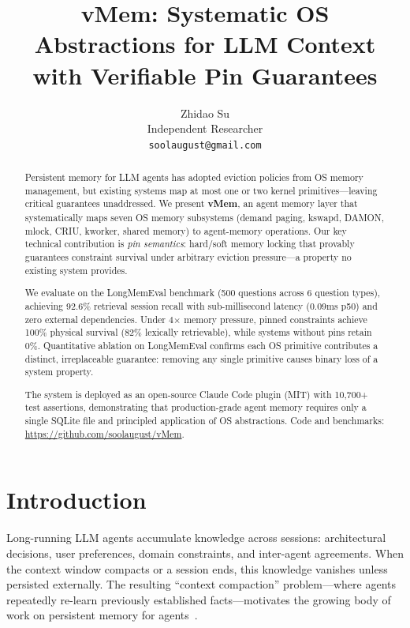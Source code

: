 \documentclass[10pt,twocolumn]{article}
\title{\textbf{vMem: Systematic OS Abstractions for LLM Context\\with Verifiable Pin Guarantees}}
\author{
  Zhidao Su \\
  Independent Researcher \\
  \texttt{soolaugust@gmail.com}
}
\date{}
\begin{document}
\maketitle

\begin{abstract}
Persistent memory for LLM agents has adopted eviction policies from OS memory management, but existing systems map at most one or two kernel primitives---leaving critical guarantees unaddressed. We present \textbf{vMem}, an agent memory layer that systematically maps seven OS memory subsystems (demand paging, kswapd, DAMON, mlock, CRIU, kworker, shared memory) to agent-memory operations. Our key technical contribution is \emph{pin semantics}: hard/soft memory locking that provably guarantees constraint survival under arbitrary eviction pressure---a property no existing system provides.

We evaluate on the LongMemEval benchmark (500 questions across 6 question types), achieving 92.6\% retrieval session recall with sub-millisecond latency (0.09ms p50) and zero external dependencies. Under 4$\times$ memory pressure, pinned constraints achieve 100\% physical survival (82\% lexically retrievable), while systems without pins retain 0\%. Quantitative ablation on LongMemEval confirms each OS primitive contributes a distinct, irreplaceable guarantee: removing any single primitive causes binary loss of a system property.

The system is deployed as an open-source Claude Code plugin (MIT) with 10{,}700+ test assertions, demonstrating that production-grade agent memory requires only a single SQLite file and principled application of OS abstractions. Code and benchmarks: \url{https://github.com/soolaugust/vMem}.
\end{abstract}

\section{Introduction}
\label{sec:intro}

Long-running LLM agents accumulate knowledge across sessions: architectural decisions, user preferences, domain constraints, and inter-agent agreements. When the context window compacts or a session ends, this knowledge vanishes unless persisted externally. The resulting ``context compaction'' problem---where agents repeatedly re-learn previously established facts---motivates the growing body of work on persistent memory for agents~\cite{longmemeval2024,memgpt2023}.
\end{document}
